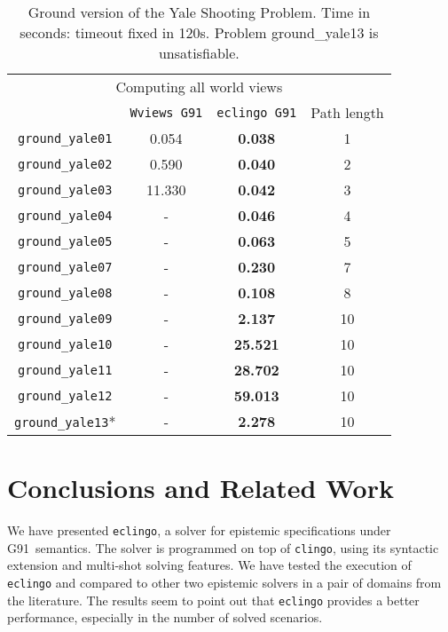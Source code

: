 \documentclass{new_tlp}
\def\eclingo{{\tt eclingo}}
\def\clingo{{\tt clingo}}
\begin{document}
\begin{table}[ht]
    \begin{tabular}{c|cc|c}
\cline{1-4}
\multicolumn{4}{c}{Computing all world views}             \\ \cline{1-4}
                   & \texttt{Wviews G91}   & \texttt{eclingo G91}  & Path length \\ \cline{1-4}
\texttt{ground\_yale01}  & 0.054     & \textbf{0.038}    & 1           \\
\texttt{ground\_yale02}  & 0.590     & \textbf{0.040}    & 2           \\
\texttt{ground\_yale03}  & 11.330    & \textbf{0.042}    & 3           \\
\texttt{ground\_yale04}  & -         & \textbf{0.046}    & 4           \\
\texttt{ground\_yale05}  & -         & \textbf{0.063}    & 5           \\
\texttt{ground\_yale07}  & -         & \textbf{0.230}    & 7           \\
\texttt{ground\_yale08}  & -         & \textbf{0.108}    & 8           \\
\texttt{ground\_yale09}  & -         & \textbf{2.137}    & 10          \\
\texttt{ground\_yale10}  & -         & \textbf{25.521}   & 10          \\
\texttt{ground\_yale11}  & -         & \textbf{28.702}   & 10          \\
\texttt{ground\_yale12}  & -         & \textbf{59.013}   & 10          \\
\texttt{ground\_yale13}* & -         & \textbf{2.278}    & 10          \\ \cline{1-4}
\end{tabular}
\setlength{\abovecaptionskip}{5pt}
\caption{Ground version of the Yale Shooting Problem. Time in seconds: timeout fixed in 120s. Problem ground\_yale13 is unsatisfiable.}
\label{tab:ground_yale}
\end{table}

\section{Conclusions and Related Work}
\label{sec:conc}

We have presented \eclingo{}, a solver for epistemic specifications under G91~semantics.
%
The solver is programmed on top of \clingo, using its syntactic extension and multi-shot solving features.
%
We have tested the execution of \eclingo{} and compared to other two epistemic solvers in a pair of domains from the literature.
%
The results seem to point out that \eclingo{} provides a better performance, especially in the number of solved scenarios.
\end{document}
